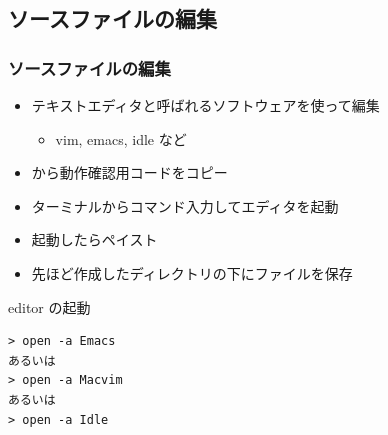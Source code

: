 \subsection{ソースファイルの編集}
\begin{frame}[containsverbatim]
\frametitle{ソースファイルの編集}
  \begin{itemize}
\item テキストエディタと呼ばれるソフトウェアを使って編集
    \begin{itemize}
\item vim, emacs, idle など
    \end{itemize}
\item \href{https://sites.google.com/presystems.xyz/elementarycs/top}{} から動作確認用コードをコピー
\item ターミナルからコマンド入力してエディタを起動
\item 起動したらペイスト
\item 先ほど作成したディレクトリの下にファイルを保存
  \end{itemize}
  \begin{itembox}{editor の起動}
\scriptsize
    \begin{verbatim}
> open -a Emacs
あるいは
> open -a Macvim
あるいは
> open -a Idle
    \end{verbatim}
  \end{itembox}
\end{frame}
%
%

